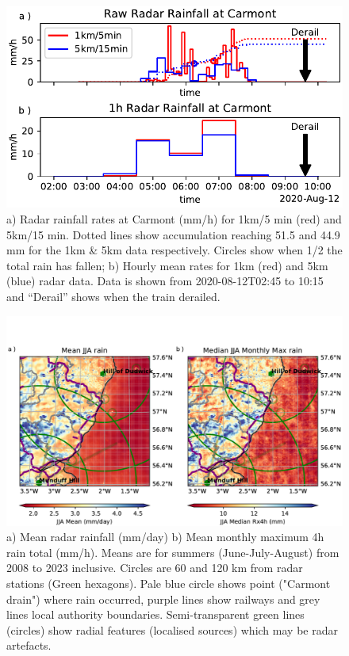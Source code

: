 \documentclass[11pt,a4paper]{article}
\begin{document}
\clearpage
\begin{figure}[ht!]
	\centering
	\includegraphics[width=0.5\linewidth]{radar_carmont}
	\caption{a) Radar rainfall rates at Carmont (mm/h) for 1km/5 min (red) and 5km/15 min. Dotted lines show accumulation reaching 51.5 and 44.9 mm for the 1km \& 5km data respectively. Circles show when 1/2 the total rain has fallen; b) Hourly mean rates for 1km (red) and 5km (blue) radar data. Data is shown from 2020-08-12T02:45 to 10:15 and ``Derail'' shows when the train derailed. }
	\label{fig:aug2020_rain}
\end{figure}

\begin{figure}[ht!]
	\centering
	\includegraphics[width=\linewidth]{radar_jja}
	\caption{a) Mean radar rainfall (mm/day) b) Mean monthly maximum 4h rain total (mm/h). Means are for summers (June-July-August) from 2008 to 2023 inclusive. Circles are  60 and 120 km from radar stations (Green hexagons). Pale blue circle shows point ("Carmont drain") where rain occurred, purple lines show railways and grey lines local authority boundaries. Semi-transparent green lines (circles) show radial features (localised sources) which may be radar artefacts. }
	\label{fig:radar_jja}
\end{figure}
\end{document}
